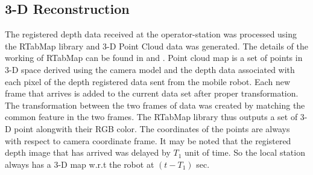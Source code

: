 \subsection{3-D Reconstruction }
The registered depth data received at the operator-station was processed using the RTabMap library \cite{rtabmap} and 3-D Point Cloud data was generated. The details of the working of RTabMap can be found in \cite{labbertab} and \cite{labbe2013appearance}.  Point cloud map is a set of points in 3-D space derived using the camera model and the depth data associated with each pixel of the depth registered data sent from the mobile robot. Each new frame that arrives is added to the current data set after proper transformation. The transformation between the two frames of data was created by matching the common feature in the two frames. The RTabMap library thus outputs a set of 3-D point alongwith their RGB color. The coordinates of the points are always  with respect to camera coordinate frame. It may be noted that the registered depth image that has arrived was delayed by $T_1$ unit of time. So the local station always has a 3-D map w.r.t  the robot at $(t-T_1)$ sec.
 

